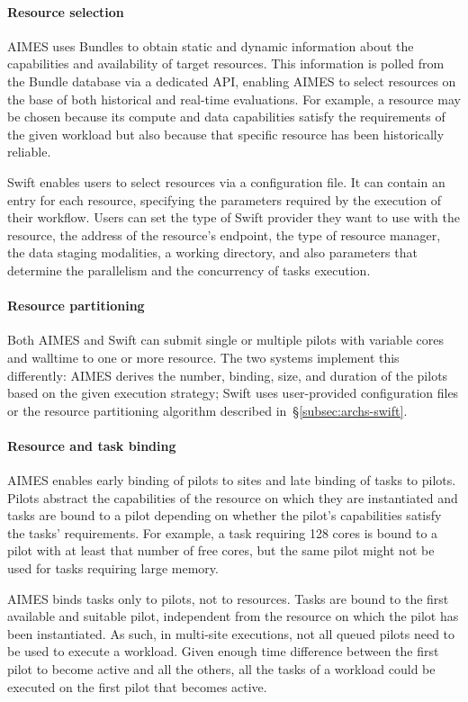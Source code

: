 \documentclass[10pt, conference, compsocconf]{IEEEtran}
\begin{document}
\paragraph{Resource selection} AIMES uses Bundles to obtain static and dynamic
information about the capabilities and availability of target resources. This
information is polled from the Bundle database via a dedicated API, enabling
AIMES to select resources on the base of both historical and real-time
evaluations. For example, a resource may be chosen because its compute and data
capabilities satisfy the requirements of the given workload but also because
that specific resource has been historically reliable.

Swift enables users to select resources via a configuration file. It can contain
an entry for each resource, specifying the parameters required by the execution
of their workflow. Users can set the type of Swift provider they want to use
with the resource, the address of the resource's endpoint, the type of resource
manager, the data staging modalities, a working directory, and also parameters
that determine the parallelism and the concurrency of tasks execution.

\paragraph{Resource partitioning} Both AIMES and Swift can submit single or
multiple pilots with variable cores and walltime to one or more resource. The
two systems implement this differently: AIMES derives the number, binding, size,
and duration of the pilots based on the given execution strategy; Swift uses
user-provided configuration files or the resource partitioning algorithm
described in~\S\ref{subsec:archs-swift}.

\paragraph{Resource and task binding} AIMES enables early binding of pilots
to sites and late binding of tasks to pilots. Pilots abstract the
capabilities of the resource on which they are instantiated and tasks are
bound to a pilot depending on whether the pilot's capabilities satisfy the
tasks' requirements. For example, a task requiring 128 cores is bound to a
pilot with at least that number of free cores, but the same pilot might not
be used for tasks requiring large memory.

AIMES binds tasks only to pilots, not to resources. Tasks are bound to the
first available and suitable pilot, independent from the resource on which
the pilot has been instantiated. As such, in multi-site executions, not all
queued pilots need to be used to execute a workload. Given enough time
difference between the first pilot to become active and all the others, all
the tasks of a workload could be executed on the first pilot that becomes
active.
\end{document}
